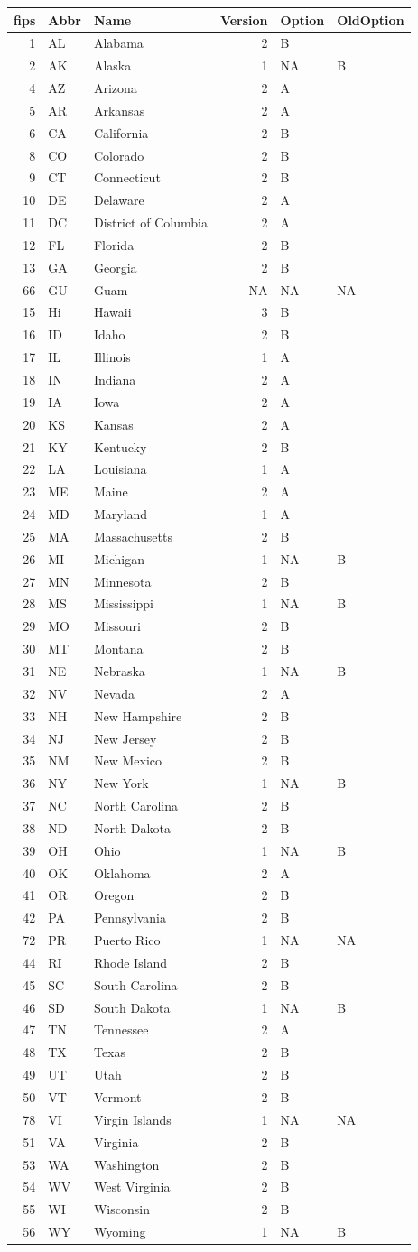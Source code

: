 \documentclass[]{article}
\begin{document}
\begin{longtable}[c]{@{}rllrll@{}}
\toprule
fips & Abbr & Name & Version & Option & OldOption\tabularnewline
\midrule
\endhead
1 & AL & Alabama & 2 & B &\tabularnewline
2 & AK & Alaska & 1 & NA & B\tabularnewline
4 & AZ & Arizona & 2 & A &\tabularnewline
5 & AR & Arkansas & 2 & A &\tabularnewline
6 & CA & California & 2 & B &\tabularnewline
8 & CO & Colorado & 2 & B &\tabularnewline
9 & CT & Connecticut & 2 & B &\tabularnewline
10 & DE & Delaware & 2 & A &\tabularnewline
11 & DC & District of Columbia & 2 & A &\tabularnewline
12 & FL & Florida & 2 & B &\tabularnewline
13 & GA & Georgia & 2 & B &\tabularnewline
66 & GU & Guam & NA & NA & NA\tabularnewline
15 & Hi & Hawaii & 3 & B &\tabularnewline
16 & ID & Idaho & 2 & B &\tabularnewline
17 & IL & Illinois & 1 & A &\tabularnewline
18 & IN & Indiana & 2 & A &\tabularnewline
19 & IA & Iowa & 2 & A &\tabularnewline
20 & KS & Kansas & 2 & A &\tabularnewline
21 & KY & Kentucky & 2 & B &\tabularnewline
22 & LA & Louisiana & 1 & A &\tabularnewline
23 & ME & Maine & 2 & A &\tabularnewline
24 & MD & Maryland & 1 & A &\tabularnewline
25 & MA & Massachusetts & 2 & B &\tabularnewline
26 & MI & Michigan & 1 & NA & B\tabularnewline
27 & MN & Minnesota & 2 & B &\tabularnewline
28 & MS & Mississippi & 1 & NA & B\tabularnewline
29 & MO & Missouri & 2 & B &\tabularnewline
30 & MT & Montana & 2 & B &\tabularnewline
31 & NE & Nebraska & 1 & NA & B\tabularnewline
32 & NV & Nevada & 2 & A &\tabularnewline
33 & NH & New Hampshire & 2 & B &\tabularnewline
34 & NJ & New Jersey & 2 & B &\tabularnewline
35 & NM & New Mexico & 2 & B &\tabularnewline
36 & NY & New York & 1 & NA & B\tabularnewline
37 & NC & North Carolina & 2 & B &\tabularnewline
38 & ND & North Dakota & 2 & B &\tabularnewline
39 & OH & Ohio & 1 & NA & B\tabularnewline
40 & OK & Oklahoma & 2 & A &\tabularnewline
41 & OR & Oregon & 2 & B &\tabularnewline
42 & PA & Pennsylvania & 2 & B &\tabularnewline
72 & PR & Puerto Rico & 1 & NA & NA\tabularnewline
44 & RI & Rhode Island & 2 & B &\tabularnewline
45 & SC & South Carolina & 2 & B &\tabularnewline
46 & SD & South Dakota & 1 & NA & B\tabularnewline
47 & TN & Tennessee & 2 & A &\tabularnewline
48 & TX & Texas & 2 & B &\tabularnewline
49 & UT & Utah & 2 & B &\tabularnewline
50 & VT & Vermont & 2 & B &\tabularnewline
78 & VI & Virgin Islands & 1 & NA & NA\tabularnewline
51 & VA & Virginia & 2 & B &\tabularnewline
53 & WA & Washington & 2 & B &\tabularnewline
54 & WV & West Virginia & 2 & B &\tabularnewline
55 & WI & Wisconsin & 2 & B &\tabularnewline
56 & WY & Wyoming & 1 & NA & B\tabularnewline
\bottomrule
\end{longtable}
\end{document}

